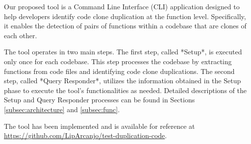 \en

Our proposed tool is a Command Line Interface (CLI) application designed to
help developers identify code clone duplication at the function level.
Specifically, it enables the detection of pairs of functions within a codebase
that are clones of each other.

The tool operates in two main steps. The first step, called *Setup*, is
executed only once for each codebase. This step processes the codebase by
extracting functions from code files and identifying code clone duplications.
The second step, called *Query Responder*, utilizes the information obtained in
the Setup phase to execute the tool’s functionalities as needed. Detailed
descriptions of the Setup and Query Responder processes can be found in
Sections \ref{subsec:architecture} and \ref{subsec:func}.

The tool has been implemented and is available for reference at
\url{https://github.com/LipArcanjo/test-duplication-code}.

